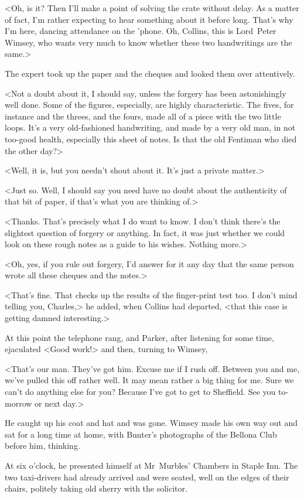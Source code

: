<Oh, is it? Then I'll make a point of solving the crate without delay. As a matter of fact, I'm rather expecting to hear something about it before long. That's why I'm here, dancing attendance on the 'phone. Oh, Collins, this is Lord~Peter Wimsey, who wants very much to know whether these two handwritings are the same.>

The expert took up the paper and the cheques and looked them over attentively.

<Not a doubt about it, I should say, unless the forgery has been astonishingly well done. Some of the figures, especially, are highly characteristic. The fives, for instance and the threes, and the fours, made all of a piece with the two little loops. It's a very old-fashioned handwriting, and made by a very old man, in not too-good health, especially this sheet of notes. Is that the old Fentiman who died the other day?>

<Well, it is, but you needn't shout about it. It's just a private matter.>

<Just so. Well, I should say you need have no doubt about the authenticity of that bit of paper, if that's what you are thinking of.>

<Thanks. That's precisely what I do want to know. I don't think there's the slightest question of forgery or anything. In fact, it was just whether we could look on these rough notes as a guide to his wishes. Nothing more.>

<Oh, yes, if you rule out forgery, I'd answer for it any day that the same person wrote all these cheques and the notes.>

<That's fine. That checks up the results of the finger-print test too. I don't mind telling you, Charles,> he added, when Collins had departed, <that this case is getting damned interesting.>

At this point the telephone rang, and Parker, after listening for some time, ejaculated <Good work!> and then, turning to Wimsey,

<That's our man. They've got him. Excuse me if I rush off. Between you and me, we've pulled this off rather well. It may mean rather a big thing for me. Sure we can't do anything else for you? Because I've got to get to Sheffield. See you to-morrow or next day.>

He caught up his coat and hat and was gone. Wimsey made his own way out and sat for a long time at home, with Bunter's photographs of the Bellona Club before him, thinking.

At six o'clock, he presented himself at Mr~Murbles' Chambers in Staple Inn. The two taxi-drivers had already arrived and were seated, well on the edges of their chairs, politely taking old sherry with the solicitor.

